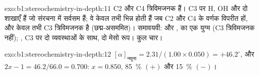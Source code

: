 \begin{solution}{exo:b1:stereochemistry-in-depth:11}
C2 और C4 त्रिविमजनक हैं। C3 पर H, OH और दो शाखाएँ हैं जो
संरचना में सर्वसम हैं; वे केवल तभी भिन्न होती हैं जब C2 और C4 के वर्णक
विपरीत हों, और केवल तभी C3 त्रिविमजनक है (छद्म-असममित)। समावयवी:
 और ,  का एक युग्म (C3 त्रिविमजनक नहीं);
, C3 पर दो व्यवस्थाओं के साथ, दो मेसो रूप। कुल चार।
\end{solution}

\begin{solution}{exo:b1:stereochemistry-in-depth:12}
$[\alpha]_{\text{नमूना}} = 2.31/(1.00 \times 0.050) = +46.2^\circ$, और
$2x - 1 = 46.2/66.0 = 0.700$: $x = 0.850$, \qty{85}{\percent}
$(+)$  और \qty{15}{\percent} $(-)$।
\end{solution}

